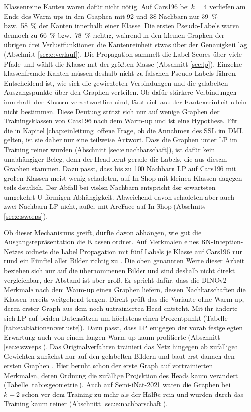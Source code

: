 Klassenreine Kanten waren dafür nicht nötig. Auf Cars196 bei $k=4$ verliefen am Ende des Warm-ups in den Graphen mit 92 und 38 Nachbarn nur \qty{39}{\percent} bzw.\ \qty{58}{\percent} der Kanten innerhalb einer Klasse. Die ersten Pseudo-Labels waren dennoch zu \qty{66}{\percent} bzw.\ \qty{78}{\percent} richtig, während in den kleinen Graphen der übrigen drei Verlustfunktionen die Kantenreinheit etwas über der Genauigkeit lag (Abschnitt \ref{sec:e:verlauf}). Die Propagation sammelt die Label-Scores über viele Pfade und wählt die Klasse mit der größten Masse (Abschnitt \ref{sec:lp}). Einzelne klassenfremde Kanten müssen deshalb nicht zu falschen Pseudo-Labels führen. Entscheidend ist, wie sich die gewichteten Verbindungen und die gelabelten Ausgangspunkte über den Graphen verteilen. Ob dafür stärkere Verbindungen innerhalb der Klassen verantwortlich sind, lässt sich aus der Kantenreinheit allein nicht bestimmen. Diese Deutung stützt sich nur auf wenige Graphen der Trainingsklassen von Cars196 nach dem Warm-up und ist eine Hypothese. Für die in Kapitel \ref{chap:einleitung} offene Frage, ob die Annahmen des \ac{SSL} im \ac{DML} gelten, ist sie daher nur eine teilweise Antwort. Dass die Graphen unter \ac{LP} im Training reiner wurden (Abschnitt \ref{sec:e:nachbarschaft}), ist dafür kein unabhängiger Beleg, denn der Head lernt gerade die Labels, die aus diesem Graphen stammen. Dazu passt, dass bis zu 100 Nachbarn \ac{LP} auf Cars196 mit großen Klassen meist wenig schadeten, auf In-Shop mit kleinen Klassen dagegen teils deutlich. Der Abfall bei vielen Nachbarn entspricht der erwarteten umgekehrt U-förmigen Abhängigkeit. Abweichend davon schadeten aber auch zwei Nachbarn \ac{LP} nicht, außer mit ArcFace auf In-Shop (Abschnitt \ref{sec:e:sweeps}).

Ob dieser Mechanismus greift, dürfte davon abhängen, wie gut die Ausgangsrepräsentation die Klassen ordnet. Auf Merkmalen eines BN-Inception-Netzes ordnete die Label Propagation mit fünf Labels je Klasse auf Cars196 nur rund ein Fünftel aller Bilder richtig zu \cite{zhuang_deep_2023}. Die oben genannten Werte dieser Arbeit beziehen sich nur auf die übernommenen Bilder und sind deshalb nicht direkt vergleichbar, der Abstand ist aber groß. Er spricht dafür, dass die DINOv2-Merkmale nach dem Warm-up einen Graphen liefern, dessen Nachbarschaften die Klassen bereits weitgehend tragen. Direkt prüft das die Variante ohne Warm-up, deren erster Graph aus dem noch untrainierten Head entsteht. Mit ihr änderte sich \ac{LP} auf beiden Datensätzen um höchstens einen Prozentpunkt (Tabelle \ref{tab:e:ablationen:verluste}). Dazu passt, dass \ac{LP} entgegen der vorab festgelegten Erwartung auch von einem langen Warm-up kaum profitierte (Abschnitt \ref{sec:e:sweeps}). Das Originalverfahren trainiert das Netz hingegen ab zufälligen Gewichten zunächst nur auf den gelabelten Bildern und baut erst danach den ersten Graphen \cite{iscen_label_2019}. Hier beruht schon der erste Graph auf vortrainierten Merkmalen, deren Ordnung die zufällige Projektion des Heads kaum verändert (Tabelle \ref{tab:e:geometrie}). Auch auf Semi-iNat-2021 waren die Graphen bei $k=2$ schon vor dem Training zu mehr als der Hälfte rein und wurden durch das Training kaum reiner (Abschnitt \ref{sec:e:nachbarschaft}).

